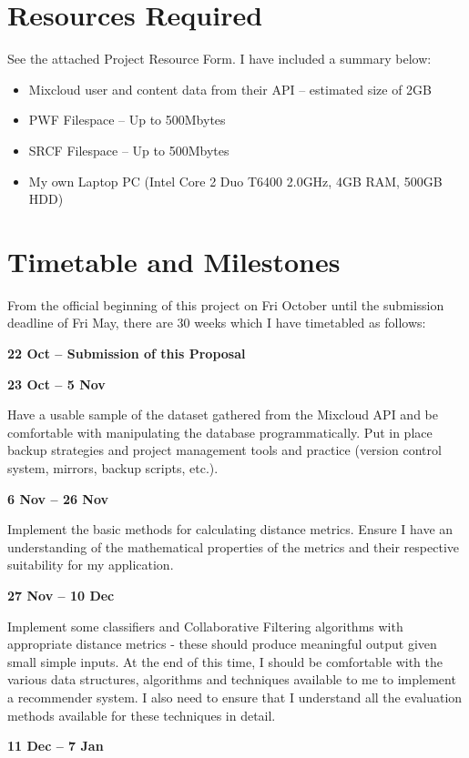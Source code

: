 \section{Resources Required}
See the attached Project Resource Form. I have included a summary below:
\begin{itemize}
\item Mixcloud user and content data from their API -- estimated size of 2GB
\item PWF Filespace -- Up to 500Mbytes
\item SRCF Filespace  -- Up to 500Mbytes
\item My own Laptop PC (Intel Core 2 Duo T6400 2.0GHz, 4GB RAM, 500GB HDD)
\end{itemize}

\section{Timetable and Milestones}

From the official beginning of this project on Fri  October until the submission deadline of Fri  May, there are 30 weeks which I have timetabled as follows:

\textbf{22 Oct -- Submission of this Proposal}

\textbf{23 Oct -- 5 Nov}

Have a usable sample of the dataset gathered from the Mixcloud API and be comfortable with manipulating the database programmatically.
Put in place backup strategies and project management tools and practice (version control system, mirrors, backup scripts, etc.).

\textbf{6 Nov -- 26 Nov}

Implement the basic methods for calculating distance metrics.
Ensure I have an understanding of the mathematical properties of the metrics and their respective suitability for my application.

\textbf{27 Nov -- 10 Dec}

Implement some classifiers and Collaborative Filtering algorithms with appropriate distance metrics - these should produce meaningful output given small simple inputs.
At the end of this time, I should be comfortable with the various data structures, algorithms and techniques available to me to implement a recommender system.
I also need to ensure that I understand all the evaluation methods available for these techniques in detail.

\textbf{11 Dec -- 7 Jan}


